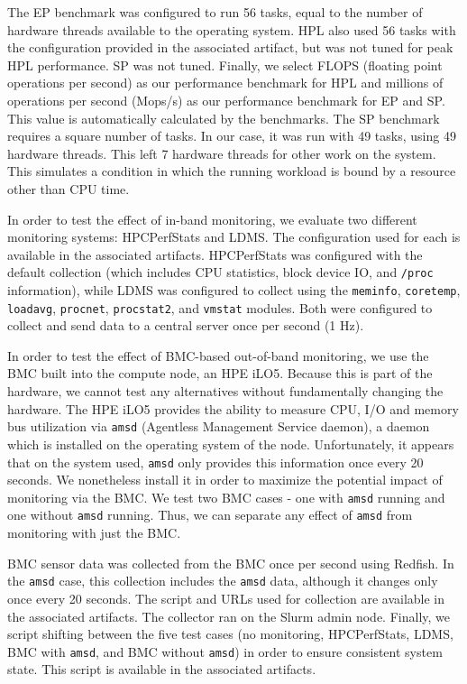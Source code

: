 \documentclass[conference]{IEEEtran}
\begin{document}
The EP benchmark was configured to run 56 tasks, equal to the number of hardware
threads available to the operating system. HPL also used 56 tasks with the configuration
provided in the associated artifact, but was not tuned for peak HPL performance. SP was not tuned. 
Finally, we select FLOPS (floating point operations per second) as our performance benchmark for HPL and 
millions of operations per second (Mops/s) as our performance benchmark for EP and SP. This 
value is automatically calculated by the benchmarks.
The SP benchmark requires a square number of tasks. In our case, 
it was run with 49 tasks, using 49 hardware threads. This left 7 hardware
threads for other work on the system. 
This simulates a condition in which the running workload is bound by a resource 
other than CPU time.

In order to test the effect of in-band monitoring, we evaluate two different 
monitoring systems: HPCPerfStats and LDMS. The configuration used for each is
available in the associated artifacts\cite{HPCNexusLabImpactofMonitoringonHPCWorkloads}.
HPCPerfStats was configured 
with the default collection (which includes CPU statistics, block device IO, and \texttt{/proc}
information), while LDMS was configured to collect using the 
\texttt{meminfo}, \texttt{coretemp}, \texttt{loadavg}, \texttt{procnet}, 
\texttt{procstat2}, and \texttt{vmstat} modules. Both were configured to collect 
and send data to a central server once per second (1 Hz).

In order to test the effect of BMC-based out-of-band monitoring, we use the BMC 
built into the compute node, an HPE iLO5. Because this is part of the hardware, 
we cannot test any alternatives without fundamentally changing the hardware.
The HPE iLO5 provides the ability to measure CPU, I/O and memory bus utilization 
via \texttt{amsd} (Agentless Management Service daemon)\cite{HPEAgentlessManagement},
a daemon which is installed on the operating system of the node.
Unfortunately, it appears that on the system used, \texttt{amsd} only provides 
this information once every 20 seconds. We nonetheless install it in order to 
maximize the potential impact of monitoring via the BMC. We test two BMC cases 
- one with \texttt{amsd} running and one without \texttt{amsd} running. Thus, we 
can separate any effect of \texttt{amsd} from monitoring with just the BMC.

BMC sensor data was collected from the BMC once per second using Redfish.
In the \texttt{amsd} case, this collection includes the \texttt{amsd} data, although it changes only once 
every 20 seconds. The 
script and URLs used for collection are available in the 
associated artifacts\cite{HPCNexusLabImpactofMonitoringonHPCWorkloads}. The collector ran on the Slurm admin node.
Finally, we script shifting between the five test cases (no monitoring, 
HPCPerfStats, LDMS, BMC with \texttt{amsd}, and BMC without \texttt{amsd}) in 
order to ensure consistent system state.
This script is available in the associated artifacts\cite{HPCNexusLabImpactofMonitoringonHPCWorkloads}.
\end{document}
